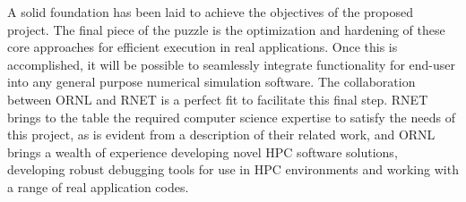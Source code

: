 A solid foundation has been laid to achieve the objectives of the proposed project. The final 
 piece of the puzzle is the optimization and hardening of these core approaches for efficient execution in real applications. 
 Once this is accomplished, it will be possible to seamlessly integrate functionality for end-user \VV into any general purpose 
 numerical simulation software. The collaboration between ORNL and 
RNET is a perfect fit to facilitate this final step. RNET brings to the table the required computer science expertise to 
satisfy the needs of this project, as is evident from a description of their related work, and ORNL brings a wealth of experience developing novel
HPC software solutions, developing robust debugging tools for use in HPC environments and working with a range of real application codes. 
